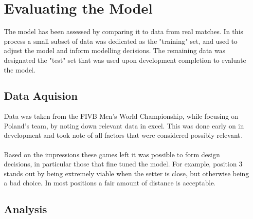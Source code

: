 \documentclass[main.tex]{subfiles}
\begin{document}
  \section{Evaluating the Model}
      
      The model has been assessed by comparing it to data from real matches. In this process a small subset of data was dedicated as the "training" set, and used to adjust the model and inform modelling decisions. The remaining data was designated the "test" set that was used upon development completion to evaluate the model.
      
      \subsection{Data Aquision}
        
        Data was taken from the FIVB Men's World Championship, while focusing on Poland's team, by noting down relevant data in excel. This was done early on in development and took note of all factors that were considered possibly relevant.
        \\\\
        Based on the impressions these games left it was possible to form design decisions, in particular those that fine tuned the model. For example, position 3 stands out by being extremely viable when the setter is close, but otherwise being a bad choice. In most positions a fair amount of distance is acceptable.
        
      \subsection{Analysis}
        
\end{document}
